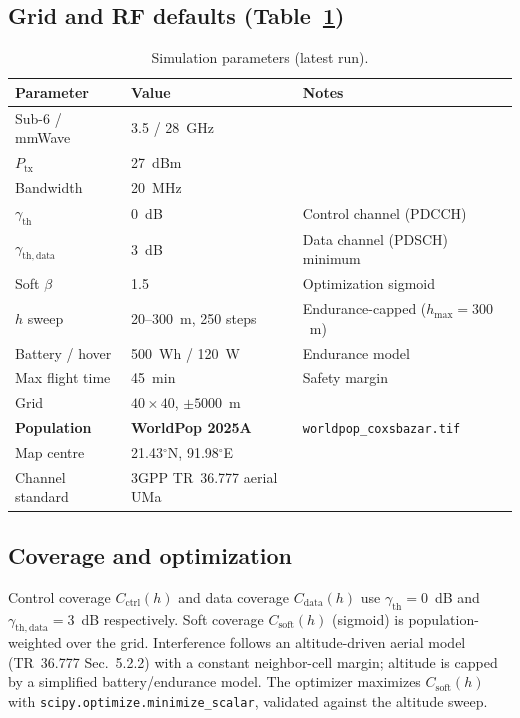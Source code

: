 \documentclass[11pt,a4paper]{article}
\begin{document}
\subsection{Grid and RF defaults (Table~\ref{tab:params})}
\begin{table}[H]
\centering
\caption{Simulation parameters (latest run).}
\label{tab:params}
\begin{tabular}{lll}
\toprule
Parameter & Value & Notes \\
\midrule
Sub-6 / mmWave & 3.5 / 28~GHz & \\
$P_{\mathrm{tx}}$ & 27~dBm & \\
Bandwidth & 20~MHz & \\
$\gamma_{\mathrm{th}}$ & 0~dB & Control channel (PDCCH) \\
$\gamma_{\mathrm{th,data}}$ & 3~dB & Data channel (PDSCH) minimum \\
Soft $\beta$ & 1.5 & Optimization sigmoid \\
$h$ sweep & 20--300~m, 250 steps & Endurance-capped ($h_{\max}=300$~m) \\
Battery / hover & 500~Wh / 120~W & Endurance model \\
Max flight time & 45~min & Safety margin \\
Grid & $40\times40$, $\pm 5000$~m & \\
\textbf{Population} & \textbf{WorldPop 2025A} & \texttt{worldpop\_coxsbazar.tif} \\
Map centre & 21.43$^\circ$N, 91.98$^\circ$E & \\
Channel standard & 3GPP TR~36.777 aerial UMa & \\
\bottomrule
\end{tabular}
\end{table}

\subsection{Coverage and optimization}
Control coverage $C_{\mathrm{ctrl}}(h)$ and data coverage $C_{\mathrm{data}}(h)$ use
$\gamma_{\mathrm{th}}=0$~dB and $\gamma_{\mathrm{th,data}}=3$~dB respectively.
Soft coverage $C_{\mathrm{soft}}(h)$ (sigmoid) is population-weighted over the grid.
Interference follows an altitude-driven aerial model (TR~36.777 Sec.~5.2.2) with a
constant neighbor-cell margin; altitude is capped by a simplified battery/endurance model.
The optimizer maximizes $C_{\mathrm{soft}}(h)$ with \texttt{scipy.optimize.minimize\_scalar},
validated against the altitude sweep.
\end{document}
